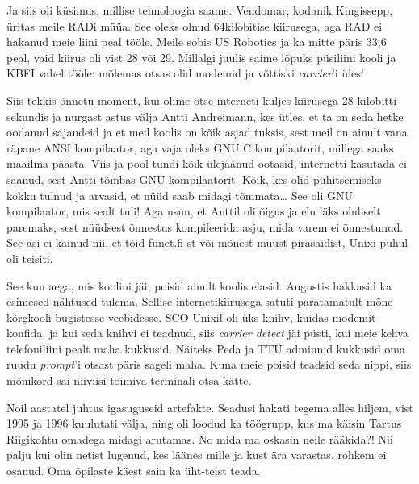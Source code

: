 Ja siis oli küsimus, millise tehnoloogia saame. Vendomar, kodanik 
Kingissepp, üritas meile 
RADi müüa. See oleks olnud 64kilobitise kiirusega, aga RAD ei hakanud 
meie liini peal tööle. Meile sobis US Robotics ja 
ka mitte päris 33,6 peal, vaid kiirus oli vist 28 või 29. Millalgi juulis saime lõpuks püsiliini kooli ja KBFI vahel tööle: 
mõlemas otsas olid modemid ja võttiski \emph{carrier}'i üles! 

Siis tekkis õnnetu moment, kui olime otse interneti küljes 
kiirusega 28 kilobitti sekundis ja nurgast astus välja Antti 
Andreimann, kes ütles, et ta on seda hetke 
oodanud sajandeid ja et meil koolis on kõik asjad tuksis, sest meil on ainult 
vana räpane ANSI kompilaator, aga vaja oleks GNU C kompilaatorit, millega saaks 
maailma päästa. Viis ja pool tundi kõik ülejäänud ootasid, internetti kasutada 
ei saanud, sest Antti tõmbas GNU kompilaatorit. Kõik, kes olid pühitsemiseks 
kokku tulnud ja arvasid, et nüüd saab midagi tõmmata\ldots{ } See oli GNU 
kompilaator, mis sealt tuli! Aga usun, et Anttil oli õigus 
ja elu läks oluliselt paremaks, sest nüüdsest õnnestus kompileerida asju, mida 
varem ei õnnestunud. See asi ei käinud nii, et tõid 
funet.fi-st või mõnest muust pirasaidist, Unixi puhul oli 
teisiti. 

See kuu aega, mis koolini jäi, poisid ainult koolis elasid. Augustis 
hakkasid ka esimesed nähtused tulema. Sellise internetikiirusega satuti paratamatult mõne kõrgkooli bugistesse 
veebidesse. SCO Unixil oli üks 
knihv, kuidas modemit konfida, ja kui seda knihvi ei teadnud, siis 
\emph{carrier detect} jäi püsti, kui meie kehva telefoniliini pealt maha 
kukkusid. Näiteks Peda ja TTÜ adminnid kukkusid oma ruudu 
\emph{prompt}'i otsast päris sageli maha. Kuna meie poisid teadsid seda 
nippi, siis mõnikord sai niiviisi toimiva terminali otsa kätte. 

Noil aastatel juhtus igasuguseid artefakte. Seadusi hakati tegema alles hiljem, vist 1995 
ja 1996 kuulutati välja, ning oli loodud ka töögrupp, kus ma käisin 
Tartus Riigikohtu omadega midagi arutamas. No mida ma oskasin 
neile rääkida?! Nii palju kui olin netist lugenud, kes läänes mille ja kust 
ära varastas, rohkem ei osanud. Oma õpilaste käest sain ka üht-teist teada.

